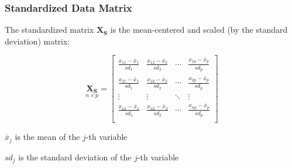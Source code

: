 \documentclass[12pt]{beamer}\usepackage[]{graphicx}\usepackage[]{color}
\begin{document}

\begin{frame}
\begin{center}
\Huge{}
\end{center}
\end{frame}


\begin{frame}
\frametitle{Standardized Data Matrix}

The standardized matrix $\mathbf{X_S}$ is the mean-centered and scaled 
(by the standard deviation) matrix:

\[ \underset{n \times p}{\mathbf{X_S}} = 
\left[\begin{array}{cccc}
\frac{x_{11} - \bar{x}_1}{sd_1} & \frac{x_{12} - \bar{x}_2}{sd_2} & \cdots & \frac{x_{1p} - \bar{x}_p}{sd_p} \\
\frac{x_{21} - \bar{x}_1}{sd_1} & \frac{x_{22} - \bar{x}_2}{sd_2} & \cdots & \frac{x_{2p} - \bar{x}_p}{sd_p} \\
\vdots & \vdots & \ddots & \vdots \\
\frac{x_{n1} - \bar{x}_1}{sd_1} & \frac{x_{n2} - \bar{x}_2}{sd_2} & \cdots & \frac{x_{np} - \bar{x}_p}{sd_p} \\
\end{array}\right]
\]

\bi
  \item $\bar{x}_j$ is the mean of the $j$-th variable
  \item $sd_j$ is the standard deviation of the $j$-th variable
\ei

\end{frame}

\end{document}
